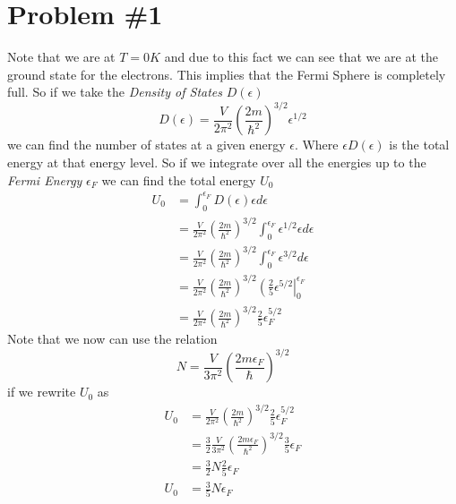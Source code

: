 \documentclass[11pt]{article}
\numberwithin{equation}{section}
\begin{document}


\section{Problem \#1}
Note that we are at $T=0\unit{K}$ and due to this fact we can see that we are at the ground state for the electrons. This implies that the Fermi Sphere is completely full. So if we take the \emph{Density of States} $D(\epsilon)$ 
\begin{equation}
D(\epsilon) = \frac{V}{2\pi^2}\left(\frac{2m}{\hbar^2}\right)^{3/2}\epsilon^{1/2}
\label{DenOState}
\end{equation}
we can find the number of states at a given energy $\epsilon$. Where $\epsilon D(\epsilon)$ is the total energy at that energy level. So if we integrate over all the energies up to the \emph{Fermi Energy} $\epsilon_F$ we can find the total energy $U_0$
\begin{align*}
U_0 &= \int_{0}^{\epsilon_F}D(\epsilon)\epsilon d\epsilon\\
&= \frac{V}{2\pi^2}\left(\frac{2m}{\hbar^2}\right)^{3/2}\int_{0}^{\epsilon_F}\epsilon^{1/2}\epsilon d\epsilon\\
&= \frac{V}{2\pi^2}\left(\frac{2m}{\hbar^2}\right)^{3/2}\int_{0}^{\epsilon_F}\epsilon^{3/2}d\epsilon\\
&= \frac{V}{2\pi^2}\left(\frac{2m}{\hbar^2}\right)^{3/2}\left(\frac{2}{5}\epsilon^{5/2}\right|_{0}^{\epsilon_F}\\
&= \frac{V}{2\pi^2}\left(\frac{2m}{\hbar^2}\right)^{3/2}\frac{2}{5}\epsilon_F^{5/2}
\end{align*}
Note that we now can use the relation
$$N = \frac{V}{3\pi^2}\left(\frac{2m\epsilon_F}{\hbar}\right)^{3/2}$$
if we rewrite $U_0$ as
\begin{align*}
U_0 &= \frac{V}{2\pi^2}\left(\frac{2m}{\hbar^2}\right)^{3/2}\frac{2}{5}\epsilon_F^{5/2}\\
&= \frac{3}{2}\frac{V}{3\pi^2}\left(\frac{2m\epsilon_F}{\hbar^2}\right)^{3/2}\frac{3}{5}\epsilon_F\\
&= \frac{3}{2}N\frac{2}{5}\epsilon_F\\
U_0 &= \frac{3}{5}N\epsilon_F
\end{align*}
\end{document}
